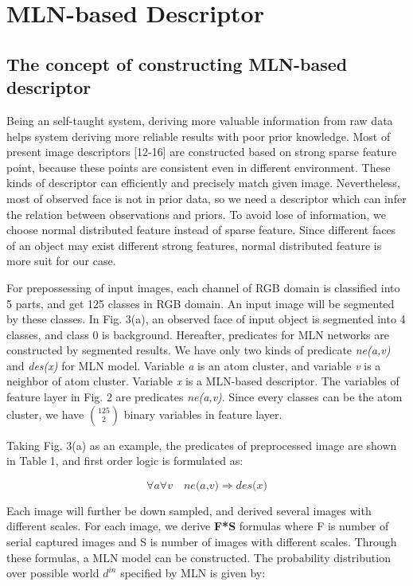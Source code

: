 \documentclass[journal]{IEEEtran}
\begin{document}
\section{MLN-based Descriptor}
\subsection{The concept of constructing MLN-based descriptor}
Being an self-taught system, deriving more valuable information from raw data helps system deriving more reliable results with poor prior knowledge. Most of present image descriptors [12-16] are constructed based on strong sparse feature point, because these points are consistent even in different environment. These kinds of descriptor can efficiently and precisely match given image. Nevertheless, most of observed face is not in prior data, so we need a descriptor which can infer the relation between observations and priors. To avoid lose of information, we choose normal distributed feature instead of sparse feature. Since different faces of an object may exist different strong features, normal distributed feature is more suit for our case. 

For prepossessing of input images, each channel of RGB domain is classified into 5 parts, and get 125 classes in RGB domain. An input image will be segmented by these classes. In Fig. 3(a), an observed face of input object is segmented into 4 classes, and class 0 is background. Hereafter, predicates for MLN networks are constructed by segmented results. We have only two kinds of predicate \textit{ne(a,v)} and  \textit{des(x)} for MLN model. Variable \textit{a} is an atom cluster, and variable \textit{v} is a neighbor of atom cluster. Variable \textit{x} is a MLN-based descriptor. The variables of feature layer in Fig. 2 are predicates \textit{ne(a,v)}. Since every classes can be the atom cluster, we have $\binom{125}{2}$ binary variables in feature layer.

Taking Fig. 3(a) as an example, the predicates of preprocessed image are shown in Table 1, and first order logic is formulated as:

\begin{equation}
\forall{a}\forall{v}\quad\textit{ne(a,v)}\Rightarrow\textit{des(x)}
\end{equation}

Each image will further be down sampled, and derived several images with different scales. For each image, we derive  \textbf{F*S} formulas where F is number of serial captured images and S is number of images with different scales. Through these formulas, a MLN model can be constructed. The probability distribution over possible world $d^{in}$ specified by MLN is given by:
\end{document}
